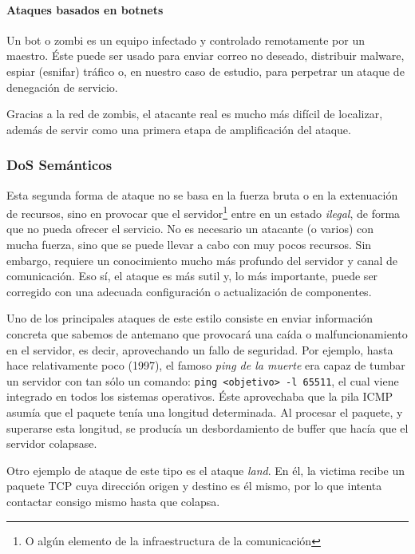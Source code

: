 \paragraph{Ataques basados en botnets}\mbox{\newline}

\noindent Un bot o zombi es un equipo infectado y controlado remotamente por un maestro. Éste puede ser usado para 
enviar correo no deseado, distribuir malware, espiar (esnifar) tráfico o, en nuestro caso de 
estudio, para perpetrar un ataque de denegación de servicio. 

Gracias a la red de zombis, el atacante real es mucho más difícil de localizar, además de servir como una primera etapa 
de amplificación del ataque.

\subsubsection{DoS Semánticos}
Esta segunda forma de ataque no se basa en la fuerza bruta o en la extenuación de recursos, sino en 
provocar que el servidor\footnote{O algún elemento de la infraestructura de la comunicación} entre en un estado 
\emph{ilegal}, de forma que no pueda ofrecer el servicio. No es necesario un atacante (o varios) con mucha fuerza, sino 
que se puede llevar a cabo con muy pocos recursos. Sin embargo, requiere un conocimiento mucho más profundo del 
servidor y canal de comunicación. Eso sí, el ataque es más sutil y, lo más importante, puede ser corregido con una 
adecuada configuración o actualización de componentes.
 
Uno de los principales ataques de este estilo consiste en enviar información concreta que sabemos de antemano que 
provocará una caída o malfuncionamiento en el servidor, es decir, aprovechando un fallo de seguridad. Por ejemplo, hasta 
hace relativamente poco (1997), el famoso \emph{ping de la muerte} \cite{Bidou} era capaz de 
tumbar un servidor con tan sólo un comando: \texttt{ping <objetivo>\ -l 65511}, el cual viene integrado en todos los 
sistemas operativos. Éste aprovechaba que la pila \gls{ICMP} asumía que el paquete tenía una longitud determinada. Al 
procesar el paquete, y superarse esta longitud, se producía un desbordamiento de buffer que hacía que el servidor 
colapsase.

Otro ejemplo de ataque de este tipo es el ataque \emph{land}. En él, la victima recibe un paquete 
\gls{TCP} cuya dirección origen y destino es él mismo, por lo que intenta contactar consigo mismo hasta que colapsa. 

